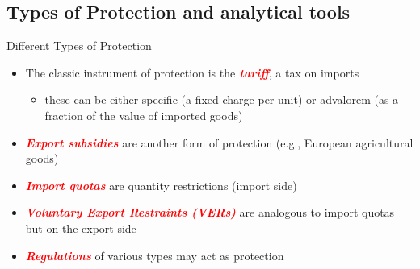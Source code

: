 \documentclass[10pt,hyperref={CJKbookmarks=true},xcolor=dvipsnames,aspectratio=169]{beamer}
\begin{document}
\subsection{Types of Protection and analytical tools}
\begin{frame}{Different Types of Protection}

\begin{itemize}
\item The classic instrument of protection is the\textbf{\textcolor{red}{\emph{
tariff}}}, a tax on imports 

\begin{itemize}
\item these can be either specific (a fixed charge per unit) or advalorem
(as a fraction of the value of imported goods) 
\end{itemize}
\item \textbf{\textcolor{red}{\emph{Export subsidies}}} are another form
of protection (e.g., European agricultural goods) 
\item \textbf{\textcolor{red}{\emph{Import quotas}}} are quantity restrictions
(import side) 
\item \textbf{\textcolor{red}{\emph{Voluntary Export Restraints (VERs)}}}
are analogous to import quotas but on the export side 
\item \textbf{\textcolor{red}{\emph{Regulations}}} of various types may
act as protection
\end{itemize}
\end{frame}
\end{document}
